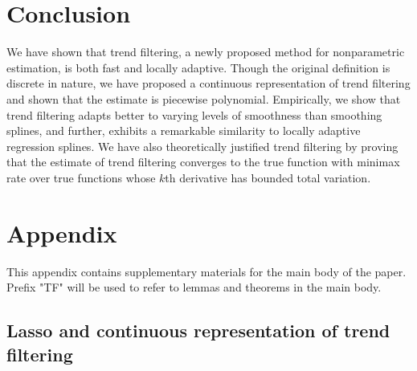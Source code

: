 \documentclass[a4paper]{article}
\begin{document}
\section{Conclusion}
\label{sec:conclusion}
We have shown that trend filtering, a newly proposed method for nonparametric estimation, is both fast and locally adaptive. Though the original definition is discrete in nature, we have proposed a continuous representation of trend filtering and shown that the estimate is piecewise polynomial. Empirically, we show that trend filtering adapts better to varying levels of smoothness than smoothing splines, and further, exhibits a remarkable similarity to locally adaptive regression splines. We have also theoretically justified trend filtering by proving that the estimate of trend filtering converges to the true function with minimax rate over true functions whose $k$th derivative has bounded total variation.



\appendix
\section*{Appendix}
\renewcommand{\thesubsection}{\Alph{subsection}}
This appendix contains supplementary materials for the main body of the paper. Prefix "TF" will be used to refer to lemmas and theorems in the main body.

\subsection{Lasso and continuous representation of trend filtering}
\end{document}
